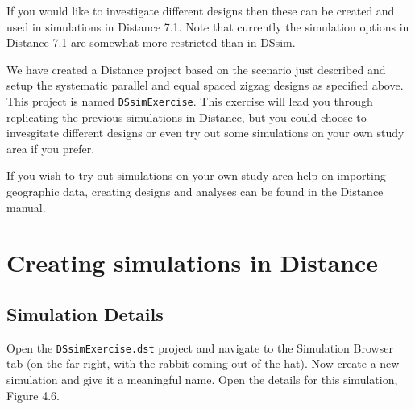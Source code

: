 \documentclass[]{book}
\theoremstyle{definition}
\theoremstyle{definition}
\theoremstyle{remark}
\begin{document}
If you would like to investigate different designs then these can be
created and used in simulations in Distance 7.1. Note that currently the
simulation options in Distance 7.1 are somewhat more restricted than in
DSsim.

We have created a Distance project based on the scenario just described
and setup the systematic parallel and equal spaced zigzag designs as
specified above. This project is named \texttt{DSsimExercise}. This
exercise will lead you through replicating the previous simulations in
Distance, but you could choose to invesgitate different designs or even
try out some simulations on your own study area if you prefer.

If you wish to try out simulations on your own study area help on
importing geographic data, creating designs and analyses can be found in
the Distance manual.

\section{Creating simulations in
Distance}\label{creating-simulations-in-distance}

\subsection{Simulation Details}\label{simulation-details}

Open the \texttt{DSsimExercise.dst} project and navigate to the
Simulation Browser tab (on the far right, with the rabbit coming out of
the hat). Now create a new simulation and give it a meaningful name.
Open the details for this simulation, Figure 4.6.
\end{document}
